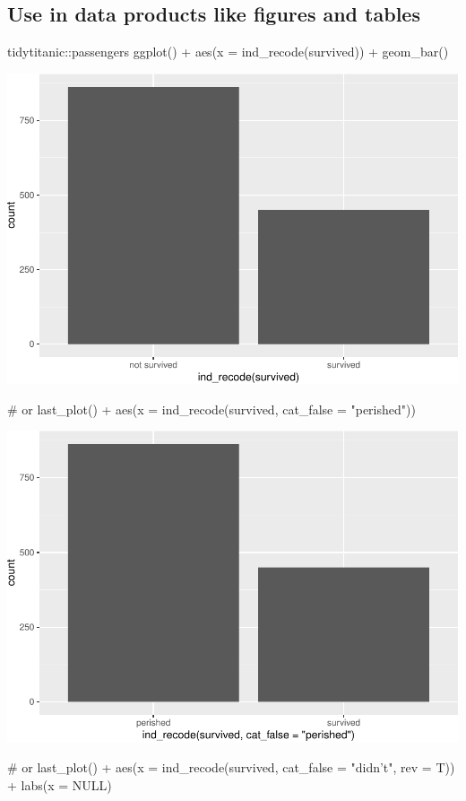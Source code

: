 \hypertarget{use-in-data-products-like-figures-and-tables}{%
\subsection{Use in data products like figures and
tables}\label{use-in-data-products-like-figures-and-tables}}

\begin{Schunk}
\begin{Sinput}
tidytitanic::passengers %
ggplot() + 
  aes(x = ind_recode(survived)) + 
  geom_bar()
\end{Sinput}

\includegraphics[width=0.69\linewidth]{r_journal_files/figure-latex/unnamed-chunk-17-1} \begin{Sinput}
# or
last_plot() +
  aes(x = ind_recode(survived, cat_false = "perished"))
\end{Sinput}

\includegraphics[width=0.69\linewidth]{r_journal_files/figure-latex/unnamed-chunk-17-2} \begin{Sinput}
# or
last_plot() +
  aes(x = ind_recode(survived, cat_false = "didn't", rev = T)) + 
  labs(x = NULL)
\end{Sinput}


\end{Schunk}
